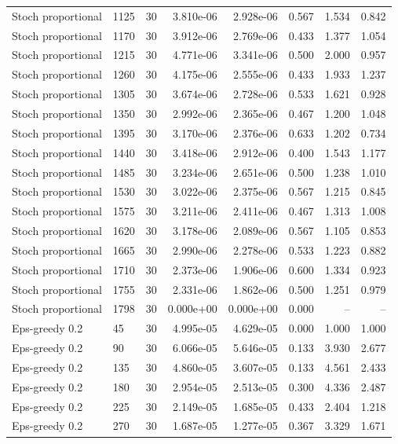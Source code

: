 \begin{scriptsize}
\begin{longtable}{llrrrrrr}
Stoch proportional & 1125 & 30 & 3.810e-06 & 2.928e-06 & 0.567 & 1.534 & 0.842 \\
Stoch proportional & 1170 & 30 & 3.912e-06 & 2.769e-06 & 0.433 & 1.377 & 1.054 \\
Stoch proportional & 1215 & 30 & 4.771e-06 & 3.341e-06 & 0.500 & 2.000 & 0.957 \\
Stoch proportional & 1260 & 30 & 4.175e-06 & 2.555e-06 & 0.433 & 1.933 & 1.237 \\
Stoch proportional & 1305 & 30 & 3.674e-06 & 2.728e-06 & 0.533 & 1.621 & 0.928 \\
Stoch proportional & 1350 & 30 & 2.992e-06 & 2.365e-06 & 0.467 & 1.200 & 1.048 \\
Stoch proportional & 1395 & 30 & 3.170e-06 & 2.376e-06 & 0.633 & 1.202 & 0.734 \\
Stoch proportional & 1440 & 30 & 3.418e-06 & 2.912e-06 & 0.400 & 1.543 & 1.177 \\
Stoch proportional & 1485 & 30 & 3.234e-06 & 2.651e-06 & 0.500 & 1.238 & 1.010 \\
Stoch proportional & 1530 & 30 & 3.022e-06 & 2.375e-06 & 0.567 & 1.215 & 0.845 \\
Stoch proportional & 1575 & 30 & 3.211e-06 & 2.411e-06 & 0.467 & 1.313 & 1.008 \\
Stoch proportional & 1620 & 30 & 3.178e-06 & 2.089e-06 & 0.567 & 1.105 & 0.853 \\
Stoch proportional & 1665 & 30 & 2.990e-06 & 2.278e-06 & 0.533 & 1.223 & 0.882 \\
Stoch proportional & 1710 & 30 & 2.373e-06 & 1.906e-06 & 0.600 & 1.334 & 0.923 \\
Stoch proportional & 1755 & 30 & 2.331e-06 & 1.862e-06 & 0.500 & 1.251 & 0.979 \\
Stoch proportional & 1798 & 30 & 0.000e+00 & 0.000e+00 & 0.000 & -- & -- \\
Eps-greedy 0.2 & 45 & 30 & 4.995e-05 & 4.629e-05 & 0.000 & 1.000 & 1.000 \\
Eps-greedy 0.2 & 90 & 30 & 6.066e-05 & 5.646e-05 & 0.133 & 3.930 & 2.677 \\
Eps-greedy 0.2 & 135 & 30 & 4.860e-05 & 3.607e-05 & 0.133 & 4.561 & 2.433 \\
Eps-greedy 0.2 & 180 & 30 & 2.954e-05 & 2.513e-05 & 0.300 & 4.336 & 2.487 \\
Eps-greedy 0.2 & 225 & 30 & 2.149e-05 & 1.685e-05 & 0.433 & 2.404 & 1.218 \\
Eps-greedy 0.2 & 270 & 30 & 1.687e-05 & 1.277e-05 & 0.367 & 3.329 & 1.671 \\

\end{longtable}
\end{scriptsize}
